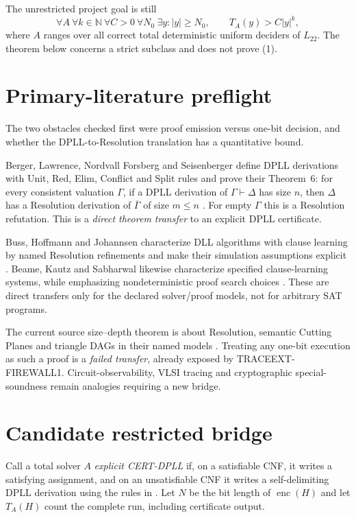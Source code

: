 \documentclass[11pt]{article}
\newcommand{\Ltwo}{L_{22}}
\begin{document}
The unrestricted project goal is still
\[
 \forall A\ \forall k\in\mathbb N\ \forall C>0\ \forall N_0\ \exists y:
 |y|\ge N_0,\qquad T_A(y)>C|y|^k,                         \tag{1}
\]
where $A$ ranges over all correct total deterministic uniform deciders of
$\Ltwo$.  The theorem below concerns a strict subclass and does not prove
(1).

\section{Primary-literature preflight}
The two obstacles checked first were proof emission versus one-bit decision,
and whether the DPLL-to-Resolution translation has a quantitative bound.

Berger, Lawrence, Nordvall Forsberg and Seisenberger define DPLL derivations
with Unit, Red, Elim, Conflict and Split rules and prove their Theorem~6:
for every consistent valuation $\Gamma$, if a DPLL derivation of
$\Gamma\vdash\Delta$ has size $n$, then $\Delta$ has a Resolution derivation
of $\overline\Gamma$ of size $m\le n$ \cite{berger}.  For empty $\Gamma$ this
is a Resolution refutation.  This is a \emph{direct theorem transfer} to an
explicit DPLL certificate.

Buss, Hoffmann and Johannsen characterize DLL algorithms with clause learning
by named Resolution refinements and make their simulation assumptions
explicit \cite{buss}.  Beame, Kautz and Sabharwal likewise characterize
specified clause-learning systems, while emphasizing nondeterministic proof
search choices \cite{beame}.  These are direct transfers only for the
declared solver/proof models, not for arbitrary SAT programs.

The current source size--depth theorem is about Resolution, semantic Cutting
Planes and triangle DAGs in their named models \cite{tradeoff}.  Treating any
one-bit execution as such a proof is a \emph{failed transfer}, already exposed
by TRACEEXT-FIREWALL1.  Circuit-observability, VLSI tracing and cryptographic
special-soundness remain analogies requiring a new bridge.

\section{Candidate restricted bridge}
Call a total solver $A$ \emph{explicit CERT-DPLL} if, on a satisfiable CNF, it
writes a satisfying assignment, and on an unsatisfiable CNF it writes a
self-delimiting DPLL derivation using the rules in \cite{berger}.  Let $N$ be
the bit length of $\operatorname{enc}(H)$ and let $T_A(H)$ count the complete
run, including certificate output.
\end{document}
